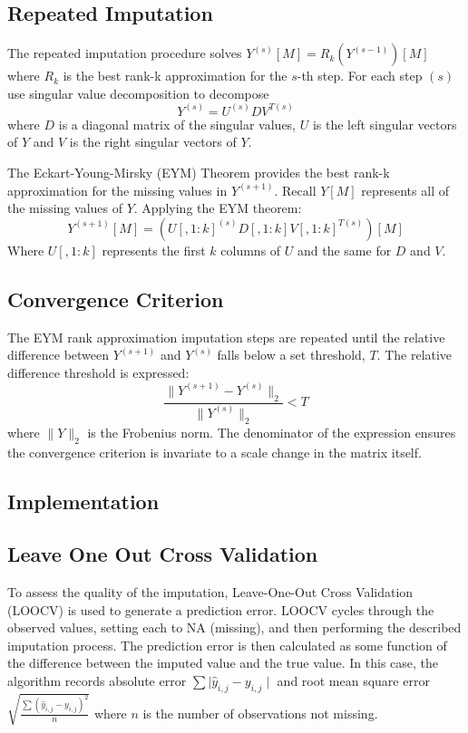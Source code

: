 \documentclass[12pt,twoside]{dukestatscithesis}
\theoremstyle{definition}
\theoremstyle{definition}
\theoremstyle{definition}
\theoremstyle{remark}
\begin{document}
\subsection{Repeated Imputation}\label{repeated-imputation}

The repeated imputation procedure solves
\(Y^{(s)}[M] = R_k(Y^{(s-1)})[M]\) where \(R_k\) is the best rank-k
approximation for the \(s\)-th step. For each step \((s)\) use singular
value decomposition to decompose \[Y^{(s)} =  U^{(s)}DV^{T(s)}\] where
\(D\) is a diagonal matrix of the singular values, \(U\) is the left
singular vectors of \(Y\) and \(V\) is the right singular vectors of
\(Y\).

The Eckart-Young-Mirsky (EYM) Theorem provides the best rank-k
approximation for the missing values in \(Y^{(s+1)}\). Recall \(Y[M]\)
represents all of the missing values of \(Y\). Applying the EYM theorem:
\[Y^{(s+1)}[M] = (U[,1:k]^{(s)}D[,1:k]V[,1:k]^{T(s)})[M]\] Where
\(U[,1:k]\) represents the first \(k\) columns of \(U\) and the same for
\(D\) and \(V\).

\subsection{Convergence Criterion}\label{convergence-criterion}

The EYM rank approximation imputation steps are repeated until the
relative difference between \(Y^{(s+1)}\) and \(Y^{(s)}\) falls below a
set threshold, \(T\). The relative difference threshold is expressed:
\[\frac{\|Y^{(s+1)}-Y^{(s)}\|_2}{\|Y^{(s)}\|_2} < T\] where \(\|Y\|_2\)
is the Frobenius norm. The denominator of the expression ensures the
convergence criterion is invariate to a scale change in the matrix
itself.

\subsection{Implementation}\label{implementation}

\subsection{Leave One Out Cross
Validation}\label{leave-one-out-cross-validation}

To assess the quality of the imputation, Leave-One-Out Cross Validation
(LOOCV) is used to generate a prediction error. LOOCV cycles through the
observed values, setting each to NA (missing), and then performing the
described imputation process. The prediction error is then calculated as
some function of the difference between the imputed value and the true
value. In this case, the algorithm records absolute error
\(\sum \mid \hat y_{i,j} - y_{i,j}\mid\) and root mean square error
\(\sqrt{\frac{\sum (\hat y_{i,j} - y_{i,j})^2}{n}}\) where \(n\) is the
number of observations not missing.
\end{document}
